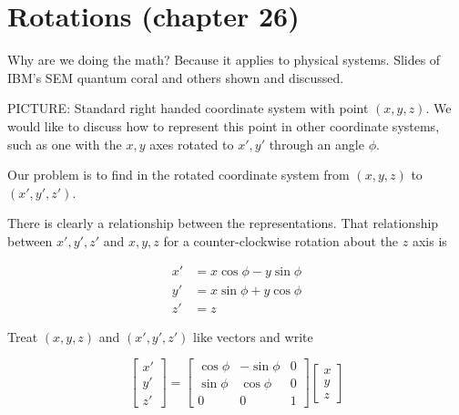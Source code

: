 %
%

\section{Rotations (chapter 26)}

Why are we doing the math?  Because it applies to physical systems.  Slides of
IBM's SEM quantum coral
and others shown and discussed.

PICTURE: Standard right handed coordinate system with point \((x,y,z)\). We would like to discuss how to represent this point in other coordinate systems, such as one with the \(x,y\) axes rotated to \(x',y'\) through an angle \(\phi\).

Our problem is to find in the rotated coordinate system from \((x,y,z)\) to \((x', y', z')\).

There is clearly a relationship between the representations.  That relationship between \(x', y', z'\) and \(x,y,z\) for a counter-clockwise rotation about the \(z\) axis is

\begin{equation}\label{eqn:PHY356FDec7:10}
\begin{aligned}
x' &= x \cos \phi - y \sin\phi \\
y' &= x \sin \phi + y \cos\phi \\
z' &= z
\end{aligned}
\end{equation}

Treat \((x,y,z)\) and \((x',y',z')\) like vectors and write

\begin{equation}\label{eqn:PHY356FDec7:20}
\begin{bmatrix}
x'  \\
y' \\
z'
\end{bmatrix}
=
\begin{bmatrix}
\cos \phi &- \sin\phi & 0 \\
\sin \phi & \cos\phi & 0 \\
0 & 0 & 1
\end{bmatrix}
\begin{bmatrix}
x  \\
y \\
z
\end{bmatrix}
\end{equation}

